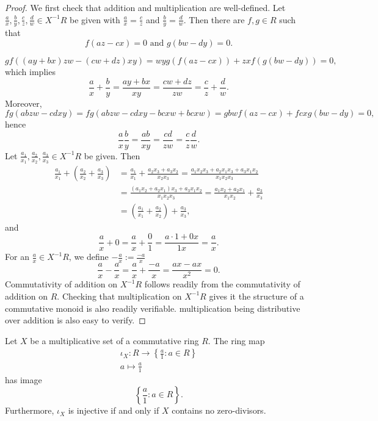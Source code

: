     \begin{proof}
        We first check that addition and multiplication are well-defined. Let $\frac{a}{x},\frac{b}{y},\frac{c}{z},\frac{d}{w}\in X^{-1}R$ be given with $\frac{a}{x}=\frac{c}{z}$ and $\frac{b}{y}=\frac{d}{w}$. Then there are $f,g\in R$ such that 
        $$
            f(az-cx)=0 \text{ and } g(bw-dy)=0.
        $$

        $$
            gf((ay+bx)zw-(cw+dz)xy)= wyg(f(az-cx))+zxf(g(bw-dy))= 0,
        $$
        which implies 
        $$
            \frac{a}{x}+\frac{b}{y}=\frac{ay+bx}{xy} = \frac{cw+dz}{zw} = \frac{c}{z}+\frac{d}{w}.
        $$
        Moreover,
        $$
            fg(abzw-cdxy)= fg(abzw-cdxy-bcxw+bcxw) =  gbwf(az-cx) + fcxg(bw-dy) = 0, 
        $$ 
        hence 
        $$
            \frac{a}{x}\frac{b}{y}=\frac{ab}{xy} = \frac{cd}{zw}= \frac{c}{z}\frac{d}{w}.
        $$
        Let $\frac{a_1}{x_1},\frac{a_2}{x_2},\frac{a_3}{x_3}\in X^{-1}R$ be given. Then
        \begin{align*}
            \frac{a_1}{x_1}+\left(\frac{a_2}{x_2}+\frac{a_3}{x_3}\right) &= \frac{a_1}{x_1}+\frac{a_2x_3+a_3x_2}{x_2x_3} = \frac{a_1x_2x_3+a_2x_1x_3+a_3x_1x_2}{x_1x_2x_3}\\
            &= \frac{(a_1x_2+a_2x_1)x_3+ a_3x_1x_2}{x_1x_2x_3} = \frac{a_1x_2+a_2x_1}{x_1x_2}+\frac{a_3}{x_3}\\
            &= \left(\frac{a_1}{x_1}+\frac{a_2}{x_2} \right)+\frac{a_3}{x_3},
        \end{align*}
        and 
        $$
            \frac{a}{x}+0 = \frac{a}{x}+\frac{0}{1}=\frac{a\cdot 1+0x}{1x}= \frac{a}{x}.
        $$  
        For an $\frac{a}{x}\in X^{-1}R$, we define $-\frac{a}{x}:= \frac{-a}{x}$
        $$
            \frac{a}{x}-\frac{a}{x}= \frac{a}{x}+\frac{-a}{x}= \frac{ax-ax}{x^2}=0.
        $$
        Commutativity of addition on $X^{-1}R$ follows readily from the commutativity of addition on $R$. Checking that multiplication on $X^{-1}R$ gives it the structure of a commutative monoid is also readily verifiable. multiplication being distributive over addition is also easy to verify.
    \end{proof}
    \begin{lemma}
        Let $X$ be a multiplicative set of a commutative ring $R$. The ring map 
        \begin{gather*}
            \iota_X : R \rightarrow \left\{\frac{a}{1}:a\in R\right\}\\
            a \mapsto \frac{a}{1}
        \end{gather*} 
        has image
        $$
            \left\{\frac{a}{1} : a\in R \right\}.
        $$
        Furthermore, $\iota_X$ is injective if and only if $X$ contains no zero-divisors. 
    \end{lemma}
